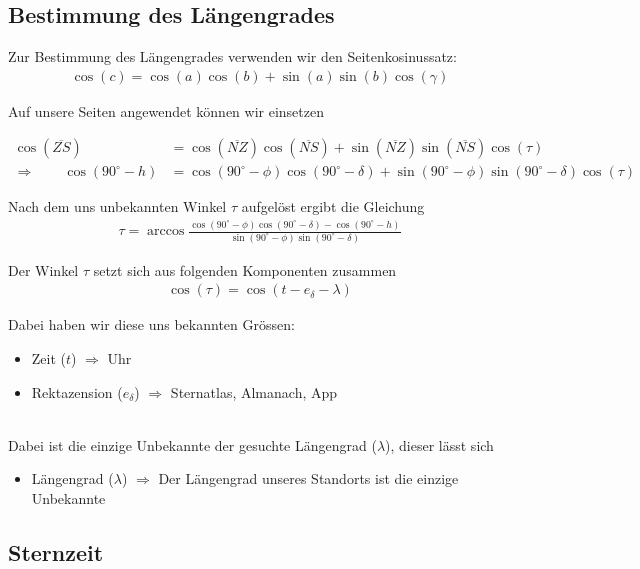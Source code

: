 \begin{refsection}
\subsection{Bestimmung des Längengrades} \label{BestimmungL} 
Zur Bestimmung des Längengrades verwenden wir den Seitenkosinussatz:
\begin{align*}
\cos(c) = \cos(a)\cos(b) + \sin(a)\sin(b)\cos(\gamma)
\end{align*}

Auf unsere Seiten angewendet können wir einsetzen

\begin{align*}
\cos(\overline{ZS}) &= \cos(\overline{NZ}) \cos(\overline{NS}) + \sin(\overline{NZ}) \sin(\overline{NS}) \cos(\tau) \\
\Rightarrow \quad \quad
\cos(90^{\circ} - h) &= \cos(90^{\circ} - \phi) \cos(90^{\circ} - \delta) + \sin(90^{\circ} - \phi)\sin(90^{\circ} - \delta) \cos(\tau)
\end{align*}

Nach dem uns unbekannten Winkel $\tau$ aufgelöst ergibt die Gleichung
\begin{align*}
\tau = \arccos 
\frac{ \cos(90^{\circ} - \phi) \cos(90^{\circ} - \delta) - \cos(90^{\circ} - h)} {\sin(90^{\circ} - \phi)\sin(90^{\circ} - \delta)}
\end{align*}

Der Winkel $\tau$ setzt sich aus folgenden Komponenten zusammen
\begin{align*}
\cos (\tau) = \cos (t - e_\delta - \lambda) 
\end{align*}

Dabei haben wir diese uns bekannten Grössen:
\begin{itemize}
\item Zeit ($t$) $\Rightarrow$ Uhr
\item Rektazension ($e_\delta$) $\Rightarrow$ Sternatlas, Almanach, App 
\end{itemize}
\\

Dabei ist die einzige Unbekannte der gesuchte Längengrad ($\lambda$), dieser lässt sich 
\begin{itemize}
\item Längengrad ($\lambda$) $\Rightarrow$ Der Längengrad unseres Standorts ist die einzige Unbekannte
\end{itemize}

\subsection{Sternzeit}



\end{refsection}
